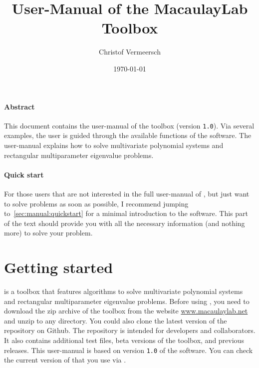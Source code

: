\documentclass{manual}
\title{User-Manual of the MacaulayLab Toolbox}
\author{Christof Vermeersch}
\date{\today}
\begin{document}
    \maketitle

    \vfill

    \paragraph*{Abstract} 
        
        This document contains the user-manual of the \maclab\space toolbox (version \texttt{1.0}). 
        Via several examples, the user is guided through the available functions of the software.
        The user-manual explains how to solve multivariate polynomial systems and rectangular multiparameter eigenvalue problems.

    \paragraph*{Quick start}

        For those users that are not interested in the full user-manual of \maclab, but just want to solve problems as soon as possible, I recommend jumping to~\cref{sec:manual:quickstart} for a minimal introduction to the software.
        This part of the text should provide you with all the necessary information (and nothing more) to solve your problem.

    \newpage
  
    \tableofcontents

    \newpage

    \section{Getting started}
        \label{sec:manual:start}

        \maclab\space is a \matlab\space toolbox that features algorithms to solve multivariate polynomial systems and rectangular multiparameter eigenvalue problems. 
        Before using \maclab, you need to download the zip archive of the toolbox from the website \url{www.macaulaylab.net} and unzip \maclab\space to any directory. 
        You could also clone the latest version of the repository on Github. 
        The repository is intended for developers and collaborators. 
        It also contains additional test files, beta versions of the toolbox, and previous releases.
        This user-manual is based on version \texttt{1.0} of the software. 
        You can check the current version of \maclab\space that you use via .
\end{document}
